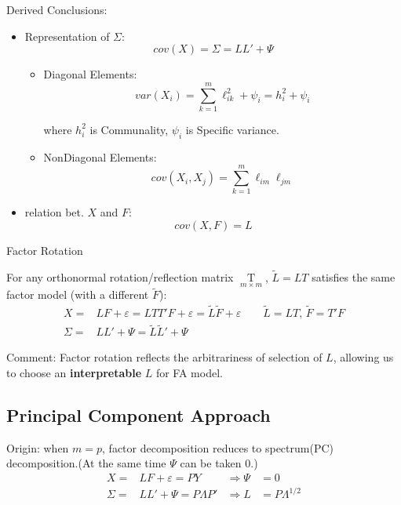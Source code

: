     Derived Conclusions:
    \begin{itemize}[topsep=2pt,itemsep=2pt]
        \item Representation of $ \Sigma  $:
        \begin{equation}
            cov(X)=\Sigma =LL'+\Psi  
        \end{equation}
        \begin{itemize}[topsep=2pt,itemsep=2pt]
            \item Diagonal Elements:
            \begin{equation}
                var(X_i)=\sum_{k=1}^m\ell^2_{ik}+\psi _i=h^2_{i}+\psi _i
            \end{equation}

            where $ h_{i}^2 $ is Communality, $ \psi _i $ is Specific variance.
            \item NonDiagonal Elements:
            \begin{equation}
                cov(X_i,X_j)=\sum_{k=1}^m\ell_{im}\ell_{jm} 
            \end{equation}
        \end{itemize}
        \item relation bet. $ X $ and $ F $:
        \begin{equation}
            cov(X,F)=L 
        \end{equation}
    \end{itemize}
    
    \begin{point}
        Factor Rotation
    \end{point}
    For any orthonormal rotation/reflection matrix $ \mathop{T}\limits_{m\times m}  $, $ \tilde{L}=LT $ satisfies the same factor model (with a different $ \tilde{F} $):
    \begin{equation*}
        \begin{aligned}
            X=&LF+\varepsilon =LTT'F+\varepsilon =\tilde{L}\tilde{F}+\varepsilon \qquad \tilde{L}=LT,\,\tilde{F}=T'F\\
            \Sigma =& LL'+\Psi =\tilde{L}\tilde{L}'+\Psi 
        \end{aligned}
    \end{equation*}

    Comment: Factor rotation reflects the arbitrariness of selection of $ L $, allowing us to choose an \textbf{interpretable} $ L $ for FA model.

        
\subsection{Principal Component Approach}
    Origin: when $ m=p $, factor decomposition reduces to spectrum(PC) decomposition.(At the same time $ \Psi  $ can be taken $ 0 $.)
    \begin{equation}
        \begin{aligned}
        X=&LF+\varepsilon =PY &\Rightarrow \Psi &=0\\
        \Sigma =&LL'+\Psi =P\Lambda P'&\Rightarrow L&=P\Lambda ^{1/2}
        \end{aligned}
    \end{equation}
    
